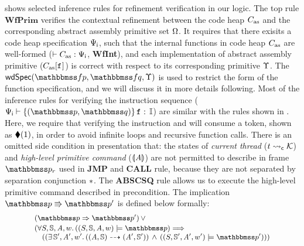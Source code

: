 \Fig{\ref{fig:Selected Inference Rules for Refinement Verification}} 
shows selected inference rules for refinement verification in our 
logic. The top rule $\textbf{WfPrim}$ verifies the contextual refinement 
between the code heap $C_{\text{as}}$ and the corresponding abstract assembly 
primitive set $\Omega$. It requires that 
there exisits a code heap specification $\Psi_{\textsf{i}}$, such that the 
internal functions in code heap $C_{\text{as}}$ are well-formed 
($\vdash {C_{\text{as}}} : {\Psi_{\textsf{i}}}$, \textbf{WfInt}), 
and each implementation of abstract 
assembly primitive ($C_{\text{as}}[\texttt{f}_{}]$) is correct with respect to 
its corresponding primitive $\Upsilon$. The 
$\wdSpec{\relspecpre}{\relspecpost}{\hprim}$ 
is used to restrict 
the form of the function specification,  
and we will discuss it in more details following. 
Most of the inference rules for verifying the instruction sequence 
($\wdcblk{\intSpec}{\relastP}{\relastQ}{\lab{}}{\cblk}$) are similar 
with the rules shown in \Fig{\ref{fig:Seleted Inference rules}}. 
Here, we require that verifying the instruction \jmp{} and \call{} 
will consume a token, shown as $\blacklozenge({1})$, in order to avoid 
infinite loops and recursive function calls. 
There is an omitted side condition in presentation that: 
the states of {\it current thread} 
(${t} \leadsto_{\textsf{c}} {\mathcal{K}}$)  
and {\it high-level primitive command} 
($\llparenthesis {\textit{A}} \rrparenthesis$) are not permitted
to describe in frame $\relastP_r$ used 
in \textbf{JMP} and \textbf{CALL} rule, 
because they are not separated by 
separation conjunction $*$.
The \textbf{ABSCSQ} rule allows us to execute the high-level 
primitive command described in precondition. 
The implication $\absExec{\relastP}{\relastP'}$ 
is defined below formally: 
\[
    \small
    \begin{array}{l}
        (\relastP \Rightarrow \relastP') \, \lor \\
        \\[-9.5pt]
        (
            \forall \state, \hpstate, \primcom, \word. \, 
            (\asrtmodel{(\state, \hpstate, \primcom, \word)}
                {\relastP}) \Longrightarrow \\
            \quad
            ((\exists \, \hpstate', \primcom', \word'. \, 
        (\primTrans{(\primcom, \hpstate)}
        	{(\primcom', \hpstate')})
        \, \land \, 
        (\asrtmodel{(\state, \hpstate', \primcom', \word')}{\relastP'})))
    \end{array}
\]
